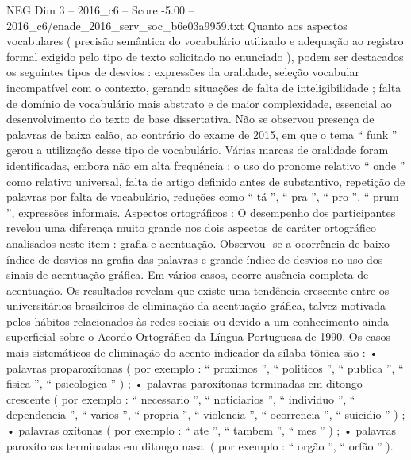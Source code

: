 \begin{textsample}{NEG Dim 3 – 2016\_c6 – Score -5.00 – 2016\_c6/enade\_2016\_serv\_soc\_b6e03a9959.txt}
Quanto aos aspectos vocabulares ( precisão semântica do vocabulário utilizado e adequação ao registro formal exigido pelo tipo de texto solicitado no enunciado ), podem ser destacados os seguintes tipos de desvios : expressões da oralidade, seleção vocabular incompatível com o contexto, gerando situações de falta de inteligibilidade ; falta de domínio de vocabulário mais abstrato e de maior complexidade, essencial ao desenvolvimento do texto de base dissertativa.
Não se observou presença de palavras de baixa calão, ao contrário do exame de 2015, em que o tema “ funk ” gerou a utilização desse tipo de vocabulário.
Várias marcas de oralidade foram identificadas, embora não em alta frequência : o uso do pronome relativo “ onde ” como relativo universal, falta de artigo definido antes de substantivo, repetição de palavras por falta de vocabulário, reduções como “ tá ”, “ pra ”, “ pro ”, “ prum ”, expressões informais.
Aspectos ortográficos : O desempenho dos participantes revelou uma diferença muito grande nos dois aspectos de caráter ortográfico analisados neste item : grafia e acentuação.
Observou -se a ocorrência de baixo índice de desvios na grafia das palavras e grande índice de desvios no uso dos sinais de acentuação gráfica.
Em vários casos, ocorre ausência completa de acentuação.
Os resultados revelam que existe uma tendência crescente entre os universitários brasileiros de eliminação da acentuação gráfica, talvez motivada pelos hábitos relacionados às redes sociais ou devido a um conhecimento ainda superficial sobre o Acordo Ortográfico da Língua Portuguesa de 1990.
Os casos mais sistemáticos de eliminação do acento indicador da sílaba tônica são : • palavras proparoxítonas ( por exemplo : “ proximos ”, “ politicos ”, “ publica ”, “ fisica ”, “ psicologica ” ) ; • palavras paroxítonas terminadas em ditongo crescente ( por exemplo : “ necessario ”, “ noticiarios ”, “ individuo ”, “ dependencia ”, “ varios ”, “ propria ”, “ violencia ”, “ ocorrencia ”, “ suicidio ” ) ; • palavras oxítonas ( por exemplo : “ ate ”, “ tambem ”, “ mes ” ) ; • palavras paroxítonas terminadas em ditongo nasal ( por exemplo : “ orgão ”, “ orfão ” ).

\end{textsample}
